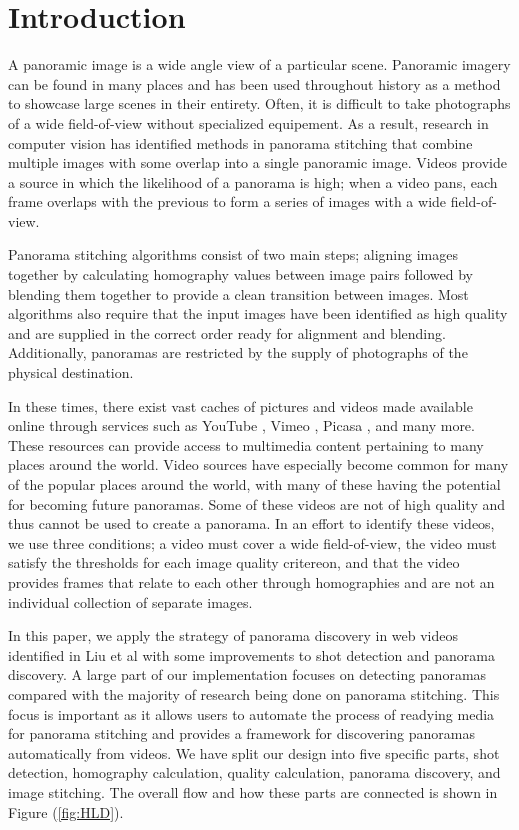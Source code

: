 \section{Introduction}
A panoramic image is a wide angle view of a particular scene. Panoramic imagery can be found in many places 
and has been used throughout history as a method to showcase large scenes in their entirety. Often, it is 
difficult to take photographs of a wide field-of-view without specialized equipement. As a result, research
in computer vision has identified methods in panorama stitching that combine multiple images with some 
overlap into a single panoramic image. Videos provide a source in which the likelihood of a panorama is high;
when a video pans, each frame overlaps with the previous to form a series of images with a wide field-of-view.
\par
Panorama stitching algorithms consist of two main steps; aligning images together by calculating homography
values between image pairs followed by blending them together to provide a clean transition between images.
Most algorithms also require that the input images have been identified as high quality and are supplied in 
the correct order ready for alignment and blending. Additionally, panoramas are restricted by the supply of
photographs of the physical destination. 
\par 
In these times, there exist vast caches of pictures and videos made available online through services such as
YouTube \cite{YouTube}, Vimeo \cite{Vimeo}, Picasa \cite{Picasa}, and many more. These resources can provide access
to multimedia content pertaining to many places around the world. Video sources have especially become common
for many of the popular places around the world, with many of these having the potential for becoming future
panoramas. Some of these videos are not of high quality and thus cannot be used to create a panorama. In an 
effort to identify these videos, we use three conditions; a video must cover a wide field-of-view, the video
must satisfy the thresholds for each image quality critereon, and that the video provides frames that relate
to each other through homographies and are not an individual collection of separate images.
\par
In this paper, we apply the strategy of panorama discovery in web videos identified in Liu et al \cite{Feng} 
with some improvements to shot detection and panorama discovery. A large part of our implementation focuses
on detecting panoramas compared with the majority of research being done on panorama stitching. This focus
is important as it allows users to automate the process of readying media for panorama stitching and provides
a framework for discovering panoramas automatically from videos. We have split our design into five specific 
parts, shot detection, homography calculation, quality calculation, panorama discovery, and image stitching. 
The overall flow and how these parts are connected is shown in Figure (\ref{fig:HLD}).